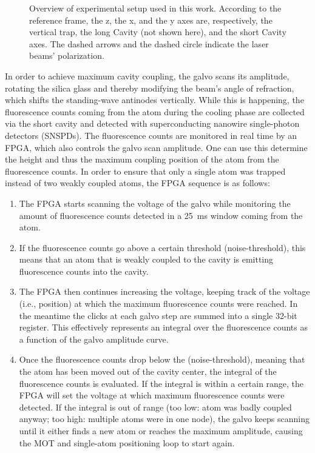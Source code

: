 \begin{figure}[htpb]
	\centering
	
	\caption{Overview of experimental setup used in this work. According to the reference frame, the z, the x, and the y axes are, respectively, the vertical trap, the long Cavity (not shown here), and the short Cavity axes. The dashed arrows and the dashed circle indicate the laser beams’ polarization.}
	\label{fig:cavx_entire_laser_setup}
\end{figure}

In order to achieve maximum cavity coupling, the galvo scans its amplitude, rotating the silica glass and thereby modifying the beam's angle of refraction, which shifts the standing-wave antinodes vertically. While this is happening, the fluorescence counts coming from the atom during the cooling phase are collected via the short cavity and detected with superconducting nanowire single-photon detectors (SNSPDs). The fluorescence counts are monitored in real time by an FPGA, which also controls the galvo scan amplitude. One can use this determine the height and thus the maximum coupling position of the atom from the fluorescence counts. In order to ensure that only a single atom was trapped instead of two weakly coupled atoms, the FPGA sequence is as follows:

\begin{enumerate}
	\item The FPGA starts scanning the voltage of the galvo while monitoring the amount of fluorescence counts detected in a \SI{25}{ms} window coming from the atom.
	\item If the fluorescence counts go above a certain threshold (noise-threshold), this means that an atom that is weakly coupled to the cavity is emitting fluorescence counts into the cavity.
	\item The FPGA then continues increasing the voltage, keeping track of the voltage (i.e., position) at which the maximum fluorescence counts were reached. In the meantime the clicks at each galvo step are summed into a single 32-bit register. This effectively represents an integral over the fluorescence counts as a function of the galvo amplitude curve.
	\item Once the fluorescence counts drop below the (noise-threshold), meaning that the atom has been moved out of the cavity center, the integral of the fluorescence counts is evaluated. If the integral is within a certain range, the FPGA will set the voltage at which maximum fluorescence counts were detected. If the integral is out of range (too low: atom was badly coupled anyway; too high: multiple atoms were in one node), the galvo keeps scanning until it either finds a new atom or reaches the maximum amplitude, causing the MOT and single-atom positioning loop to start again.
\end{enumerate}

